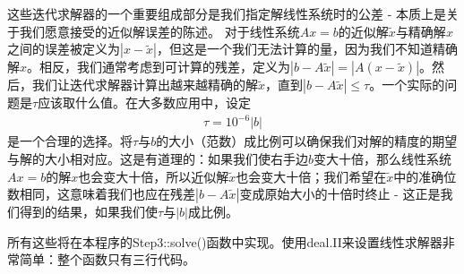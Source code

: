 \documentclass{ctexart}
\begin{document}
这些迭代求解器的一个重要组成部分是我们指定解线性系统时的公差 - 本质上是关于我们愿意接受的近似解误差的陈述。
对于线性系统$Ax=b$的近似解$\tilde x$与精确解$x$之间的误差被定义为$|x-\tilde x|$，但这是一个我们无法计算的量，因为我们不知道精确解$x$。相反，我们通常考虑到可计算的残差，定义为$|b-A\tilde x|=|A(x-\tilde x)|$。然后，我们让迭代求解器计算出越来越精确的解$\tilde x$，直到$|b-A\tilde x|\le \tau$。一个实际的问题是$\tau$应该取什么值。在大多数应用中，设定
\begin{align*}
    \tau = 10^{-6} |b|  
\end{align*}
是一个合理的选择。将$\tau$与$b$的大小（范数）成比例可以确保我们对解的精度的期望与解的大小相对应。这是有道理的：如果我们使右手边$b$变大十倍，那么线性系统$Ax=b$的解$x$也会变大十倍，所以近似解$\tilde x$也会变大十倍；我们希望在$\tilde x$中的准确位数相同，这意味着我们也应在残差$|b-A\tilde x|$变成原始大小的十倍时终止 - 这正是我们得到的结果，如果我们使$\tau$与$|b|$成比例。

所有这些将在本程序的Step3::solve()函数中实现。使用deal.II来设置线性求解器非常简单：整个函数只有三行代码。
\end{document}
